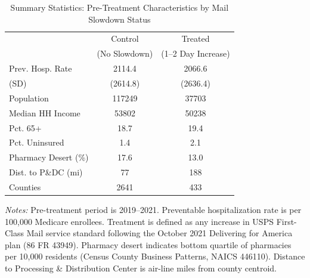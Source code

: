 \begin{table}[htbp]
\centering
\caption{Summary Statistics: Pre-Treatment Characteristics by Mail Slowdown Status}
\label{tab:summary}
\begin{tabular}{lcc}
\toprule
 & Control & Treated \\
 & (No Slowdown) & (1--2 Day Increase) \\
\midrule
Prev. Hosp. Rate & 2114.4 & 2066.6 \\
(SD) & (2614.8) & (2636.4) \\
Population & 117249 & 37703 \\
Median HH Income & 53802 & 50238 \\
Pct. 65+ & 18.7 & 19.4 \\
Pct. Uninsured & 1.4 & 2.1 \\
Pharmacy Desert (\%) & 17.6 & 13.0 \\
Dist. to P\&DC (mi) & 77 & 188 \\
Counties & 2641 & 433 \\
\bottomrule
\end{tabular}
\begin{tablenotes}[flushleft]
\small
\item \textit{Notes:} Pre-treatment period is 2019--2021. Preventable hospitalization rate is per 100,000 Medicare enrollees. Treatment is defined as any increase in USPS First-Class Mail service standard following the October 2021 Delivering for America plan (86 FR 43949). Pharmacy desert indicates bottom quartile of pharmacies per 10,000 residents (Census County Business Patterns, NAICS 446110). Distance to Processing \& Distribution Center is air-line miles from county centroid.
\end{tablenotes}
\end{table}
